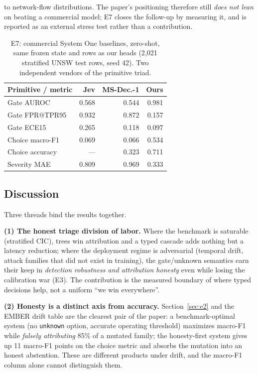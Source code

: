 \documentclass[sigconf,anonymous=false]{acmart}
\begin{document}
to network-flow distributions. The paper's positioning therefore still \emph{does not lean} on beating a commercial model; E7 closes the follow-up by measuring it, and is reported as an external stress test rather than a contribution.

\begin{table}[t]
\centering
\caption{E7: commercial System One baselines, zero-shot, same frozen state and rows as our heads (2{,}021 stratified UNSW test rows, seed 42). Two independent vendors of the primitive triad.}
\label{tab:e7}
\begin{tabular}{lrrr}
\toprule
Primitive / metric & Jev & MS-Dec.-1 & Ours \\
\midrule
Gate AUROC & 0.568 & 0.544 & 0.981 \\
Gate FPR@TPR95 & 0.932 & 0.872 & 0.157 \\
Gate ECE15 & 0.265 & 0.118 & 0.097 \\
Choice macro-F1 & 0.069 & 0.066 & 0.534 \\
Choice accuracy & --- & 0.323 & 0.711 \\
Severity MAE & 0.809 & 0.969 & 0.333 \\
\bottomrule
\end{tabular}
\end{table}

\subsection{Discussion}
Three threads bind the results together.

\textbf{(1) The honest triage division of labor.} Where the benchmark is saturable (stratified CIC), trees win attribution and a typed cascade adds nothing but a latency reduction; where the deployment regime is adversarial (temporal drift, attack families that did not exist in training), the gate/unknown semantics earn their keep in \emph{detection robustness and attribution honesty} even while losing the calibration war (E3). The contribution is the measured boundary of where typed decisions help, not a uniform ``we win everywhere''.

\textbf{(2) Honesty is a distinct axis from accuracy.} Section~\ref{sec:e2} and the EMBER drift table are the clearest pair of the paper: a benchmark-optimal system (no \texttt{unknown} option, accurate operating threshold) maximizes macro-F1 while \emph{falsely attributing} 85\% of a mutated family; the honesty-first system gives up 11 macro-F1 points on the choice metric and absorbs the mutation into an honest abstention. These are different products under drift, and the macro-F1 column alone cannot distinguish them.
\end{document}
